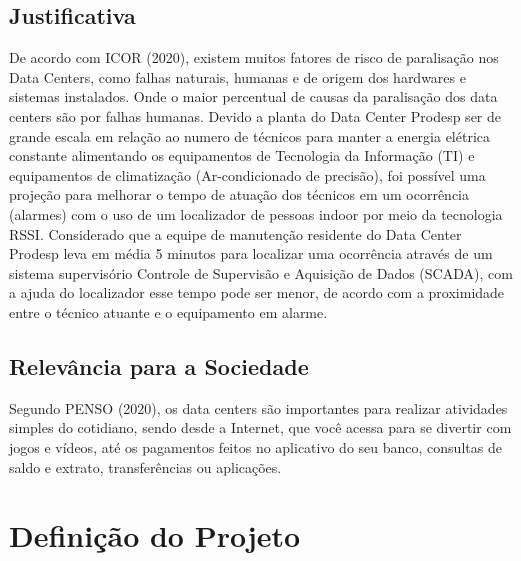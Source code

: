 \documentclass[
	article,			%
	12pt,				%
	oneside,			%
	a4paper,			%
	english,			%
	brazil,				%
	sumario=tradicional
	]{abntex2}
\begin{document}
\subsection{Justificativa}
De acordo com ICOR (2020), existem muitos fatores de risco de paralisação nos Data Centers, como falhas naturais, humanas e de origem dos hardwares e sistemas instalados. Onde o maior percentual de causas da paralisação dos data centers são por falhas humanas. 
Devido a planta do Data Center Prodesp ser de grande escala em relação ao numero de técnicos para manter a energia elétrica constante alimentando os equipamentos de Tecnologia da Informação (TI) e equipamentos de climatização (Ar-condicionado de precisão), foi possível uma projeção para melhorar o tempo de atuação dos técnicos em um ocorrência (alarmes) com o uso de um localizador de pessoas indoor por meio da tecnologia RSSI.
Considerado que a equipe de manutenção residente do Data Center Prodesp leva em média 5 minutos para localizar uma ocorrência através de um sistema supervisório Controle de Supervisão e Aquisição de Dados (SCADA), com a ajuda do localizador esse tempo pode ser menor, de acordo com a proximidade entre o técnico atuante e o equipamento em alarme. 
\subsection{Relevância para a Sociedade}
Segundo PENSO (2020), os data centers são importantes para realizar atividades simples do cotidiano, sendo desde a Internet, que você acessa para se divertir com jogos e vídeos, até os pagamentos feitos no aplicativo do seu banco, consultas de saldo e extrato, transferências ou aplicações.

\section{Definição do Projeto}
\end{document}
